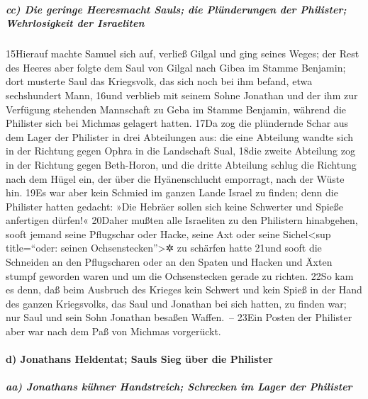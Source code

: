 \hypertarget{cc-die-geringe-heeresmacht-sauls-die-pluxfcnderungen-der-philister-wehrlosigkeit-der-israeliten}{%
\subparagraph{cc) Die geringe Heeresmacht Sauls; die Plünderungen der
Philister; Wehrlosigkeit der
Israeliten}\label{cc-die-geringe-heeresmacht-sauls-die-pluxfcnderungen-der-philister-wehrlosigkeit-der-israeliten}}

15Hierauf machte Samuel sich auf, verließ Gilgal und ging seines Weges;
der Rest des Heeres aber folgte dem Saul von Gilgal nach Gibea im Stamme
Benjamin; dort musterte Saul das Kriegsvolk, das sich noch bei ihm
befand, etwa sechshundert Mann, 16und verblieb mit seinem Sohne Jonathan
und der ihm zur Verfügung stehenden Mannschaft zu Geba im Stamme
Benjamin, während die Philister sich bei Michmas gelagert hatten. 17Da
zog die plündernde Schar aus dem Lager der Philister in drei Abteilungen
aus: die eine Abteilung wandte sich in der Richtung gegen Ophra in die
Landschaft Sual, 18die zweite Abteilung zog in der Richtung gegen
Beth-Horon, und die dritte Abteilung schlug die Richtung nach dem Hügel
ein, der über die Hyänenschlucht emporragt, nach der Wüste hin. 19Es war
aber kein Schmied im ganzen Lande Israel zu finden; denn die Philister
hatten gedacht: »Die Hebräer sollen sich keine Schwerter und Spieße
anfertigen dürfen!« 20Daher mußten alle Israeliten zu den Philistern
hinabgehen, sooft jemand seine Pflugschar oder Hacke, seine Axt oder
seine Sichel\textless sup title=``oder: seinen
Ochsenstecken''\textgreater✲ zu schärfen hatte 21und sooft die Schneiden
an den Pflugscharen oder an den Spaten und Hacken und Äxten stumpf
geworden waren und um die Ochsenstecken gerade zu richten. 22So kam es
denn, daß beim Ausbruch des Krieges kein Schwert und kein Spieß in der
Hand des ganzen Kriegsvolks, das Saul und Jonathan bei sich hatten, zu
finden war; nur Saul und sein Sohn Jonathan besaßen Waffen.~-- 23Ein
Posten der Philister aber war nach dem Paß von Michmas vorgerückt.

\hypertarget{d-jonathans-heldentat-sauls-sieg-uxfcber-die-philister}{%
\paragraph{d) Jonathans Heldentat; Sauls Sieg über die
Philister}\label{d-jonathans-heldentat-sauls-sieg-uxfcber-die-philister}}

\hypertarget{aa-jonathans-kuxfchner-handstreich-schrecken-im-lager-der-philister}{%
\subparagraph{aa) Jonathans kühner Handstreich; Schrecken im Lager der
Philister}\label{aa-jonathans-kuxfchner-handstreich-schrecken-im-lager-der-philister}}


